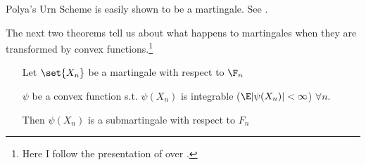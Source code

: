 \documentclass{article} %
\begin{document}
\begin{remark}
   
 \label{rk:concrete_example_of_increasing_information_process} 
\end{remark}

\begin{example}
Polya's Urn Scheme is easily shown to be a martingale.  See \cite[pp.241, Sec 5.3.2, first paragraph]{durrett2010probability}.
\end{example}


The next two theorems tell us about what happens to martingales when they are transformed by convex functions.\footnote{Here I follow the presentation of \cite[pp.233]{durrett2010probability} over \cite{ash2000probability}.}

\begin{theorem} 
%
\begin{itemize}[leftmargin=2.0cm,labelsep=0.5cm]
\item[] %
\item[Let] $\set{X_n}$ be a martingale with respect to $\F_n$
\item[\phantom{Let}] $\psi$ be a convex function s.t. $\psi(X_n)$ is integrable ($\E|\psi(X_n)| < \infty$) \quad $\forall n$.
\item[Then] $\psi(X_n)$ is a submartingale with respect to $F_n$
\end{itemize}
\label{thm:convex_functions_of_martingales_are_submartingales}
\end{theorem}
\end{document}

